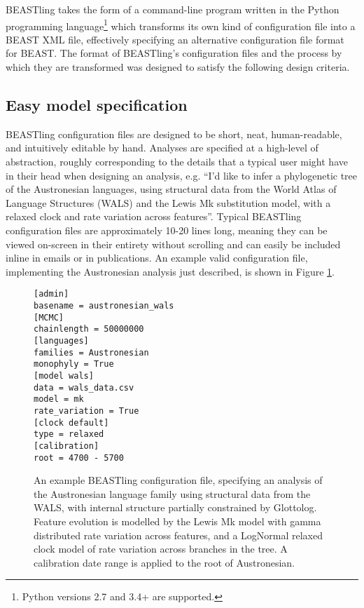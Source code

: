 \documentclass[twocolumn,10pt]{scrartcl}
\begin{document}
BEASTling takes the form of a command-line program written in the Python programming language\footnote{Python versions 2.7 and 3.4+ are supported.} which transforms its own kind of configuration file into a BEAST XML file, effectively specifying an alternative configuration file format for BEAST.  The format of BEASTling's configuration files and the process by which they are transformed was designed to satisfy the following design criteria.

\subsection{Easy model specification}

BEASTling configuration files are designed to be short, neat, human-readable, and intuitively editable by hand.  Analyses are specified at a high-level of abstraction, roughly corresponding to the details that a typical user might have in their head when designing an analysis, e.g. ``I'd like to infer a phylogenetic tree of the Austronesian languages, using structural data from the World Atlas of Language Structures\cite{Dryer2013} (WALS) and the Lewis Mk substitution model, with a relaxed clock and rate variation across features''.  Typical BEASTling configuration files are approximately 10-20 lines long, meaning they can be viewed on-screen in their entirety without scrolling and can easily be included inline in emails or in publications.  An example valid configuration file, implementing the Austronesian analysis just described, is shown in Figure \ref{fig:config}.

\begin{figure}[t]
	\begin{verbatim}[admin]
basename = austronesian_wals
[MCMC]
chainlength = 50000000
[languages]
families = Austronesian
monophyly = True
[model wals]
data = wals_data.csv
model = mk
rate_variation = True
[clock default]
type = relaxed
[calibration]
root = 4700 - 5700\end{verbatim}
\caption{An example BEASTling configuration file, specifying an analysis of the Austronesian language family using structural data from the WALS, with internal structure partially constrained by Glottolog. Feature evolution is modelled by the Lewis Mk model with gamma distributed rate variation across features, and a LogNormal relaxed clock model of rate variation across branches in the tree.  A calibration date range is applied to the root of Austronesian.}
\label{fig:config}
\end{figure}
\end{document}

